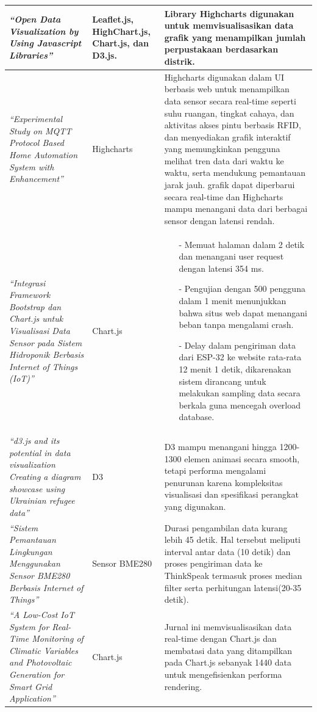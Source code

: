 \begin{longtable}{|p{}|
		p{}|
		p{}|}
	\textit{“Open Data Visualization by Using Javascript Libraries”} \cite{Vueti2023} &Leaflet.js, HighChart.js, Chart.js, dan D3.js. & Library Highcharts digunakan untuk memvisualisasikan data grafik yang menampilkan jumlah perpustakaan berdasarkan distrik. \\ \hline
	\textit{“Experimental Study on MQTT Protocol Based Home Automation System with Enhancement”} \cite{Manna2024} & Highcharts & Highcharts digunakan dalam UI berbasis web untuk menampilkan data sensor secara real-time seperti suhu ruangan, tingkat cahaya, dan aktivitas akses pintu berbasis RFID, dan menyediakan grafik interaktif yang memungkinkan pengguna melihat tren data dari waktu ke waktu, serta mendukung pemantauan jarak jauh. grafik dapat diperbarui secara real-time dan Highcharts mampu menangani data dari berbagai sensor dengan latensi rendah.\\ \hline
	\textit{“Integrasi Framework Bootstrap dan Chart.js untuk Visualisasi Data Sensor pada Sistem Hidroponik Berbasis Internet of Things (IoT)”} \cite{Toppany2023} & Chart.js & 
	\begin{itemize}
		\item[-] Memuat halaman dalam 2 detik dan menangani user request dengan latensi 354 ms. 
		\item[-]  Pengujian dengan 500 pengguna dalam 1 menit menunjukkan bahwa situs web dapat menangani beban tanpa mengalami crash.
		\item[-] Delay dalam pengiriman data dari ESP-32 ke website rata-rata 12 menit 1 detik, dikarenakan sistem dirancang untuk melakukan sampling data secara berkala guna mencegah overload database.
	\end{itemize} \\ \hline
	\textit{“d3.js and its potential in data visualization Creating a diagram showcase using Ukrainian refugee data”} \cite{Toppany2023} & D3 & 
	D3 mampu menangani hingga 1200-1300 elemen animasi secara smooth, tetapi performa mengalami penurunan karena kompleksitas visualisasi dan spesifikasi perangkat yang digunakan. \\ \hline
	\textit{“Sistem Pemantauan Lingkungan Menggunakan Sensor BME280 Berbasis Internet of Things”} \cite{Toppany2023} & Sensor BME280 & 
	Durasi pengambilan data kurang lebih 45 detik. Hal tersebut meliputi interval antar data (10 detik) dan proses pengiriman data ke ThinkSpeak termasuk proses median filter serta perhitungan latensi(20-35 detik). \\ \hline
	\textit{“A Low-Cost IoT System for Real-Time Monitoring of Climatic Variables and Photovoltaic Generation for Smart Grid Application”} \cite{Toppany2023} & Chart.js & 
	 Jurnal ini memvisualisasikan data real-time dengan Chart.js dan membatasi data yang ditampilkan pada Chart.js sebanyak 1440 data untuk mengefisienkan performa rendering. \\ \hline
\end{longtable}

